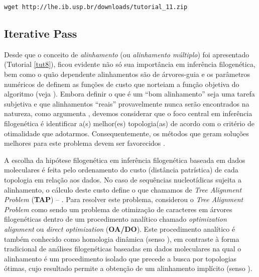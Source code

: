 \begin{center}
\small \texttt{wget http://lhe.ib.usp.br/downloads/tutorial\_11.zip}\\
\end{center}


\newpage
\pagestyle{fancy} %
\begin{refsection}
\renewcommand*{\finalnamedelim}{\addspace\&\space} %
%
\newcommand{\A}{\textcolor{green}{\textbf{A}}}
\newcommand{\C}{\textcolor{blue}{\textbf{C}}}
\newcommand{\G}{\textcolor{gray}{\textbf{G}}}
\newcommand{\T}{\textcolor{red}{\textbf{T}}}
\newcommand{\gap}{\textcolor{black}{\textbf{-}}}


\section{Iterative Pass}\label{tut11:ip}
	
Desde que o conceito de \textit{alinhamento} (ou \textit{alinhamento múltiplo}) foi apresentado (Tutorial \ref{tut8}), ficou evidente não só sua importância em inferência filogenética, bem como o quão dependente alinhamentos são de árvores-guia e os parâmetros numéricos de definem as funções de custo que norteiam a função objetiva do algoritmo (veja \textcite{Phillips_et_al_2000,Giribet_at_al_2002}). Embora definir o que é um ``bom alinhamento'' seja uma tarefa subjetiva e que alinhamentos ``reais'' provavelmente nunca serão encontrados na natureza, como argumenta \textcite{Wheeler_2012}, devemos considerar que o foco central em inferência filogenética é identificar a(s) melhor(es) topologia(as) de acordo com o critério de otimalidade que adotarmos. Consequentemente, os métodos que geram soluções melhores para este problema devem ser favorecidos \parencite[][]{Wheeler_and_Giribet_2009}.

A escolha da hipótese filogenética em inferência filogenética baseada em dados moleculares é feita pelo ordenamento do custo (distância patrística) de cada topologia em relação aos dados. No caso de sequências nucleotídicas sujeita a alinhamento, o cálculo deste custo define o que chamamos de \textit{Tree Alignment Problem} (\textbf{TAP}) -- \parencite[][]{Sankoff_1975}. Para resolver este problema, \textcite{Wheeler_1996} considerou o \textit{Tree Alignment Problem} como sendo um problema de otimização de caracteres em árvores filogenéticas dentro de um procedimento analítico chamado \textit{optimization alignment} ou \textit{direct optimization} (\textbf{OA/DO}). Este procedimento analítico é também conhecido como homologia dinâmica (senso \textcite{Wheeler_2001}), em contraste à forma tradicional de análises filogenéticas baseadas em dados moleculares na qual o alinhamento é um procedimento isolado que precede a busca por topologias ótimas, cujo resultado permite a obtenção de um alinhamento implícito (senso \textcite{Wheeler_2003a}).


\end{refsection}
